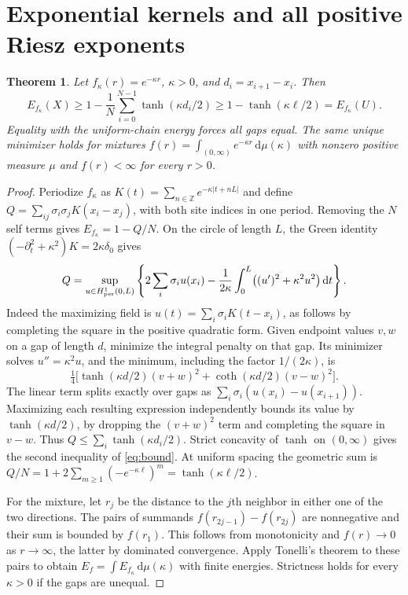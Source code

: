 \documentclass[11pt]{article}
\newtheorem{theorem}{Theorem}
\newcommand{\Z}{\mathbb Z}
\newcommand{\dd}{\,\mathrm d}
\begin{document}
\section{Exponential kernels and all positive Riesz exponents}
\begin{theorem}\label{thm:exp}
Let $f_\kappa(r)=e^{-\kappa r}$, $\kappa>0$, and $d_i=x_{i+1}-x_i$. Then
\begin{equation}\label{eq:bound}
 E_{f_\kappa}(X)\ge1-\frac1N\sum_{i=0}^{N-1}
         \tanh(\kappa d_i/2)\ge1-\tanh(\kappa\ell/2)
         =E_{f_\kappa}(U).
\end{equation}
Equality with the uniform-chain energy forces all gaps equal. The same unique minimizer holds for mixtures $f(r)=\int_{(0,\infty)}e^{-\kappa r}\dd\mu(\kappa)$ with nonzero positive measure $\mu$ and $f(r)<\infty$ for every $r>0$.
\end{theorem}
\begin{proof}
Periodize $f_\kappa$ as $K(t)=\sum_{n\in\Z}e^{-\kappa|t+nL|}$ and define
$Q=\sum_{ij}\sigma_i\sigma_j K(x_i-x_j)$, with both site indices in one period.
Removing the $N$ self terms gives $E_{f_\kappa}=1-Q/N$. On the circle of length $L$, the Green identity $(-\partial_t^2+\kappa^2)K=2\kappa\delta_0$ gives
\[
 Q=\sup_{u\in H^1_{\rm per}(0,L)}
   \left\{2\sum_i\sigma_i u(x_i)-
    \frac1{2\kappa}\int_0^L\bigl((u')^2+\kappa^2 u^2\bigr)\dd t\right\}.
\]
Indeed the maximizing field is $u(t)=\sum_i\sigma_i K(t-x_i)$, as follows by completing the square in the positive quadratic form. Given endpoint values $v,w$ on a gap of length $d$, minimize the integral penalty on that gap. Its minimizer solves $u''=\kappa^2 u$, and the minimum, including the factor $1/(2\kappa)$, is
\[
 \tfrac14\bigl[\tanh(\kappa d/2)(v+w)^2+
             \coth(\kappa d/2)(v-w)^2\bigr].
\]
The linear term splits exactly over gaps as $\sum_i\sigma_i(u(x_i)-u(x_{i+1}))$. Maximizing each resulting expression independently bounds its value by $\tanh(\kappa d/2)$, by dropping the $(v+w)^2$ term and completing the square in $v-w$. Thus $Q\le\sum_i\tanh(\kappa d_i/2)$. Strict concavity of $\tanh$ on $(0,\infty)$ gives the second inequality of \eqref{eq:bound}. At uniform spacing the geometric sum is $Q/N=1+2\sum_{m\ge1}(-e^{-\kappa\ell})^m=\tanh(\kappa\ell/2)$.

For the mixture, let $r_j$ be the distance to the $j$th neighbor in either one of the two directions. The pairs of summands $f(r_{2j-1})-f(r_{2j})$ are nonnegative and their sum is bounded by $f(r_1)$. This follows from monotonicity and $f(r)\to0$ as $r\to\infty$, the latter by dominated convergence. Apply Tonelli's theorem to these pairs to obtain $E_f=\int E_{f_\kappa}\dd\mu(\kappa)$ with finite energies. Strictness holds for every $\kappa>0$ if the gaps are unequal.
\end{proof}
\end{document}
